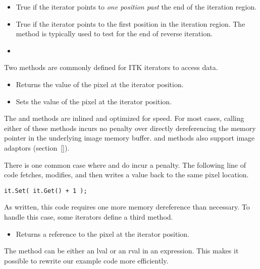 \begin{itemize}
\item \textbf{} True if the iterator points to \emph{one
position past} the end of the iteration region.

\item \textbf{} True if the iterator points to the first
position in the iteration region.  The method is typically used to test for the
end of reverse iteration.

\item \textbf{}
\end{itemize}


Two methods are commonly defined for ITK iterators to access data.

\begin{itemize}
\item \textbf{} Returns the value of the pixel at the
iterator position.

\item \textbf{}Sets the value of the pixel at the
iterator position.
\end{itemize}


The  and  methods are inlined and optimized for speed. For
most cases, calling either of these methods incurs no penalty over directly
dereferencing the memory pointer in the underlying image memory buffer.
 and  methods also support image adaptors (section~\ref{}).

There is one common case where  and  do incur a penalty.
The following line of code fetches, modifies, and then writes a value back to
the same pixel location.

\begin{verbatim}
it.Set( it.Get() + 1 );
\end{verbatim}

As written, this code requires one more memory dereference than necessary.  To
handle this case, some iterators define a third method.

\begin{itemize}
\item \textbf{} Returns a reference to the pixel at
the iterator position.
\end{itemize}

The  method can be either an lval or an rval in an expression.  This
makes it possible to rewrite our example code more efficiently.

